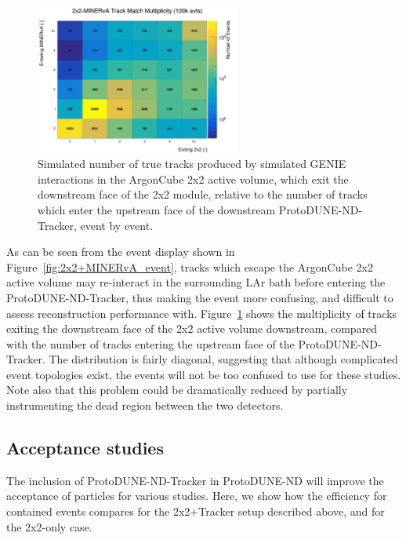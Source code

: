 \begin{figure}[htb]
  \centering
  \includegraphics[width=0.6\textwidth]{plots/2x2_minerva_plots/track_mathch_topo.png}
  \caption{Simulated number of true tracks produced by simulated GENIE interactions in the ArgonCube 2x2 active volume, which exit the downstream face of the 2x2 module, relative to the number of tracks which enter the upstream face of the downstream ProtoDUNE-ND-Tracker, event by event.}
  \label{fig:track_multiplicity_topo}
\end{figure}
As can be seen from the event display shown in Figure~\ref{fig:2x2+MINERvA_event}, tracks which escape the ArgonCube 2x2 active volume may re-interact in the surrounding LAr bath before entering the ProtoDUNE-ND-Tracker, thus making the event more confusing, and difficult to assess reconstruction performance with. Figure~\ref{fig:track_multiplicity_topo} shows the multiplicity of tracks exiting the downstream face of the 2x2 active volume downstream, compared with the number of tracks entering the upstream face of the ProtoDUNE-ND-Tracker. The distribution is fairly diagonal, suggesting that although complicated event topologies exist, the events will not be too confused to use for these studies. Note also that this problem could be dramatically reduced by partially instrumenting the dead region between the two detectors.

\subsection{Acceptance studies}
\label{sec:minerva-acceptance}
The inclusion of ProtoDUNE-ND-Tracker in ProtoDUNE-ND will improve the acceptance of particles for various studies. Here, we show how the efficiency for contained events compares for the 2x2+Tracker setup described above, and for the 2x2-only case.

